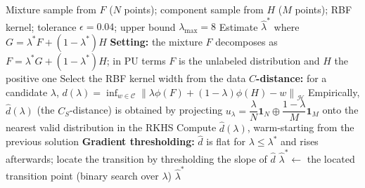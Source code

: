 \documentclass{article}
\begin{document}
\begin{algorithm}[!h]
\renewcommand{\algorithmicrequire}{\textbf{Input:}}
\renewcommand{\algorithmicensure}{\textbf{Output:}}
	\caption{KM1 / KM2 (mixture proportion estimation via kernel embeddings)}
	\begin{algorithmic}[1]
	    \REQUIRE
	    Mixture sample from $F$ ($N$ points); component sample from $H$ ($M$ points);
	    RBF kernel; tolerance $\epsilon=0.04$; upper bound $\lambda_{\max}=8$
	    \ENSURE
	    Estimate $\hat{\lambda}^{\ast}$ where $G=\lambda^{\ast}F+(1-\lambda^{\ast})H$
	    \STATE \textbf{Setting:} the mixture $F$ decomposes as
	    $F=\lambda^{\ast}G+(1-\lambda^{\ast})H$; in PU terms $F$ is the unlabeled
	    distribution and $H$ the positive one %
	    \STATE Select the RBF kernel width from the data
	    \STATE \textbf{$C$-distance:} for a candidate $\lambda$,
	    \STATE \quad $d(\lambda)=\inf_{w\in\mathcal{C}}\left\|\lambda\phi(F)+(1-\lambda)\phi(H)-w\right\|_{\mathcal{H}}$ %
	    \STATE \quad Empirically, $\hat{d}(\lambda)$ (the $C_{S}$-distance) is obtained by projecting
	    $u_{\lambda}=\dfrac{\lambda}{N}\mathbf{1}_{N}\oplus\dfrac{1-\lambda}{M}\mathbf{1}_{M}$
	    onto the nearest valid distribution in the RKHS %
	    \STATE Compute $\hat{d}(\lambda)$, warm-starting from the previous solution %
	    \ENDFOR
	    \STATE \textbf{Gradient thresholding:} $\hat{d}$ is flat for $\lambda\leq\lambda^{\ast}$ and rises
	    afterwards; locate the transition by thresholding the slope of $\hat{d}$ %
	    \STATE $\hat{\lambda}^{\ast}\leftarrow$ the located transition point (binary search over $\lambda$)
		\RETURN $\hat{\lambda}^{\ast}$
	\end{algorithmic}
\end{algorithm}
\end{document}
